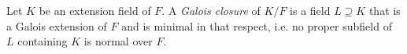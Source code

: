 \documentclass[12pt]{article}
\begin{document}
Let $K$ be an extension field of $F$. A \emph{Galois closure} of $K/F$ is a field $L \supseteq K$ that is a Galois extension of $F$ and is minimal in that respect, i.e. no proper subfield of $L$ containing $K$ is normal over $F$.
\end{document}
